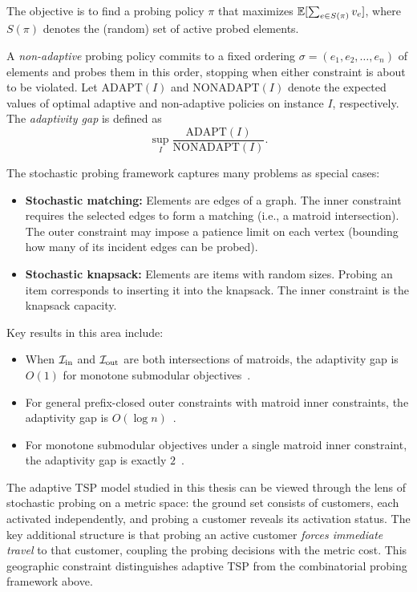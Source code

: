 The objective is to find a probing policy $\pi$ that maximizes $\mathbb{E}[\sum_{e \in S(\pi)} v_e]$, where $S(\pi)$ denotes the (random) set of active probed elements.

\begin{definition}
    A \emph{non-adaptive} probing policy commits to a fixed ordering $\sigma = (e_1, e_2, \dots, e_n)$ of elements and probes them in this order, stopping when either constraint is about to be violated.
    Let $\mathrm{ADAPT}(I)$ and $\mathrm{NONADAPT}(I)$ denote the expected values of optimal adaptive and non-adaptive policies on instance $I$, respectively. The \emph{adaptivity gap} is defined as
    \[
        \sup_{I} \frac{\mathrm{ADAPT}(I)}{\mathrm{NONADAPT}(I)}.
    \]
\end{definition}

The stochastic probing framework captures many problems as special cases:
\begin{itemize}
    \item \textbf{Stochastic matching:} Elements are edges of a graph. The inner constraint requires the selected edges to form a matching (i.e., a matroid intersection). The outer constraint may impose a patience limit on each vertex (bounding how many of its incident edges can be probed).
    \item \textbf{Stochastic knapsack:} Elements are items with random sizes. Probing an item corresponds to inserting it into the knapsack. The inner constraint is the knapsack capacity.
\end{itemize}

Key results in this area include:
\begin{itemize}
    \item When $\mathcal{I}_{\mathrm{in}}$ and $\mathcal{I}_{\mathrm{out}}$ are both intersections of matroids, the adaptivity gap is $O(1)$ for monotone submodular objectives~\cite{GuptaNagarajanSingla2017}.
    \item For general prefix-closed outer constraints with matroid inner constraints, the adaptivity gap is $O(\log n)$~\cite{GuptaNagarajanSingla2016}.
    \item For monotone submodular objectives under a single matroid inner constraint, the adaptivity gap is exactly $2$~\cite{BradacSinglaZuzic2019}.
\end{itemize}

\begin{remark}
    The adaptive TSP model studied in this thesis can be viewed through the lens of stochastic probing on a metric space: the ground set consists of customers, each activated independently, and probing a customer reveals its activation status. The key additional structure is that probing an active customer \emph{forces immediate travel} to that customer, coupling the probing decisions with the metric cost. This geographic constraint distinguishes adaptive TSP from the combinatorial probing framework above.
\end{remark}

